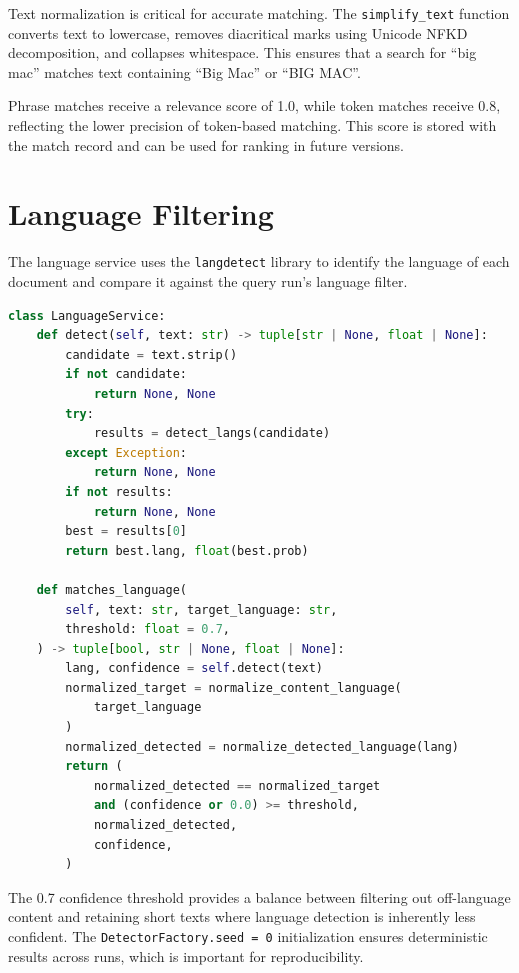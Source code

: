 Text normalization is critical for accurate matching. The \texttt{simplify\_text} function converts text to lowercase, removes diacritical marks using Unicode NFKD decomposition, and collapses whitespace. This ensures that a search for ``big mac'' matches text containing ``Big Mac'' or ``BIG MAC''.

Phrase matches receive a relevance score of 1.0, while token matches receive 0.8, reflecting the lower precision of token-based matching. This score is stored with the match record and can be used for ranking in future versions.

\section{Language Filtering}
\label{sec:language_filtering}

The language service uses the \texttt{langdetect} library to identify the language of each document and compare it against the query run's language filter.

\begin{lstlisting}[language=Python, caption={Language detection and filtering}]
class LanguageService:
    def detect(self, text: str) -> tuple[str | None, float | None]:
        candidate = text.strip()
        if not candidate:
            return None, None
        try:
            results = detect_langs(candidate)
        except Exception:
            return None, None
        if not results:
            return None, None
        best = results[0]
        return best.lang, float(best.prob)

    def matches_language(
        self, text: str, target_language: str,
        threshold: float = 0.7,
    ) -> tuple[bool, str | None, float | None]:
        lang, confidence = self.detect(text)
        normalized_target = normalize_content_language(
            target_language
        )
        normalized_detected = normalize_detected_language(lang)
        return (
            normalized_detected == normalized_target
            and (confidence or 0.0) >= threshold,
            normalized_detected,
            confidence,
        )
\end{lstlisting}

\begin{sloppypar}
The 0.7 confidence threshold provides a balance between filtering out off-language content and retaining short texts where language detection is inherently less confident. The \texttt{DetectorFactory.seed = 0} initialization ensures deterministic results across runs, which is important for reproducibility.
\end{sloppypar}

